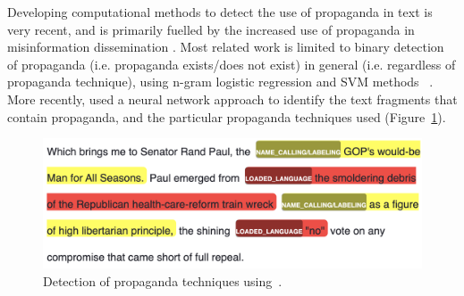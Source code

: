 Developing computational methods to detect the use of propaganda in text is very recent, and is primarily fuelled by the increased use of propaganda in misinformation dissemination \citep{da2020survey}. Most related work is limited to binary detection of propaganda (i.e. propaganda exists/does not exist) in general (i.e. regardless of propaganda technique), using n-gram logistic regression and SVM methods ~\citep{rashkin2017truth,barron2019proppy}. More recently, \citet{da2019fine} used a neural network approach to identify the text fragments that contain propaganda, and the particular propaganda techniques used (Figure~\ref{fig:propaganda_example_1}).





\begin{figure}[!htb]
    \centering
    \includegraphics[width=\linewidth]{figures/propaganda_example_1_color.png}
    \caption{Detection of propaganda techniques using~\citet{baly2020we}.%
    }
    \label{fig:propaganda_example_1}
\end{figure}



